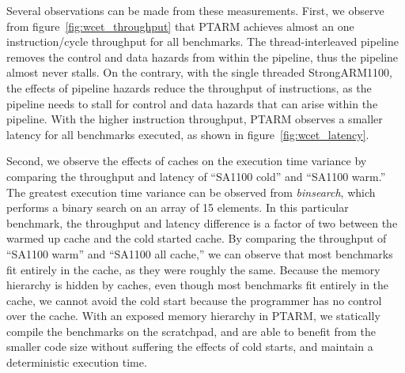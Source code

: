 Several observations can be made from these measurements. 
First, we observe from figure~\ref{fig:wcet_throughput} that PTARM achieves almost an one instruction/cycle throughput for all benchmarks. 
The thread-interleaved pipeline removes the control and data hazards from within the pipeline, thus the pipeline almost never stalls.
On the contrary, with the single threaded StrongARM1100, the effects of pipeline hazards reduce the throughput of instructions, as the pipeline needs to stall for control and data hazards that can arise within the pipeline. 
With the higher instruction throughput, PTARM observes a smaller latency for all benchmarks executed, as shown in figure~\ref{fig:wcet_latency}.
  
Second, we observe the effects of caches on the execution time variance by comparing the throughput and latency of ``SA1100 cold'' and ``SA1100 warm.'' 
The greatest execution time variance can be observed from \emph{binsearch}, which performs a binary search on an array of 15 elements. 
In this particular benchmark, the throughput and latency difference is a factor of two between the warmed up cache and the cold started cache.
By comparing the throughput of ``SA1100 warm'' and ``SA1100 all cache,'' we can observe that most benchmarks fit entirely in the cache, as they were roughly the same. 
Because the memory hierarchy is hidden by caches, even though most benchmarks fit entirely in the cache, we cannot avoid the cold start because the programmer has no control over the cache. 
With an exposed memory hierarchy in PTARM, we statically compile the benchmarks on the scratchpad, and are able to benefit from the smaller code size without suffering the effects of cold starts, and maintain a deterministic execution time. 

